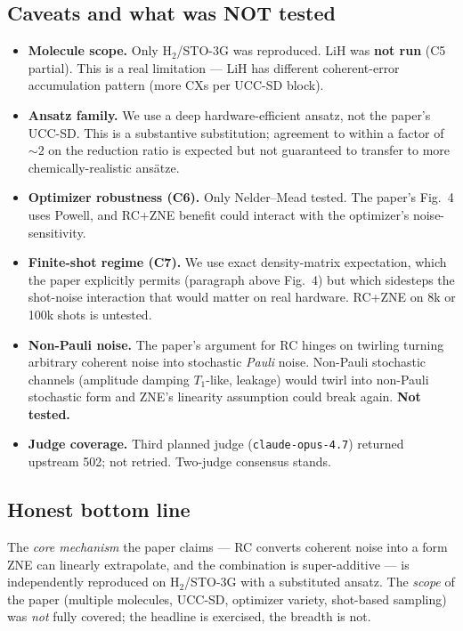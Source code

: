 \documentclass[11pt]{article}
\begin{document}
\subsection{Caveats and what was NOT tested}
\begin{itemize}
  \item \textbf{Molecule scope.} Only H$_2$/STO-3G was reproduced. LiH was
        \textbf{not run} (C5 partial). This is a real limitation --- LiH has
        different coherent-error accumulation pattern (more CXs per UCC-SD
        block).
  \item \textbf{Ansatz family.} We use a deep hardware-efficient ansatz, not
        the paper's UCC-SD. This is a substantive substitution; agreement to
        within a factor of $\sim 2$ on the reduction ratio is expected but not
        guaranteed to transfer to more chemically-realistic ans\"atze.
  \item \textbf{Optimizer robustness (C6).} Only Nelder--Mead tested. The
        paper's Fig.~4 uses Powell, and RC+ZNE benefit could interact with the
        optimizer's noise-sensitivity.
  \item \textbf{Finite-shot regime (C7).} We use exact density-matrix
        expectation, which the paper explicitly permits (paragraph above
        Fig.~4) but which sidesteps the shot-noise interaction that would
        matter on real hardware. RC+ZNE on 8k or 100k shots is untested.
  \item \textbf{Non-Pauli noise.} The paper's argument for RC hinges on
        twirling turning arbitrary coherent noise into stochastic \emph{Pauli}
        noise. Non-Pauli stochastic channels (amplitude damping $T_1$-like,
        leakage) would twirl into non-Pauli stochastic form and ZNE's linearity
        assumption could break again. \textbf{Not tested.}
  \item \textbf{Judge coverage.} Third planned judge (\texttt{claude-opus-4.7})
        returned upstream 502; not retried. Two-judge consensus stands.
\end{itemize}

\subsection{Honest bottom line}
The \emph{core mechanism} the paper claims --- RC converts coherent noise into a
form ZNE can linearly extrapolate, and the combination is super-additive --- is
independently reproduced on H$_2$/STO-3G with a substituted ansatz. The
\emph{scope} of the paper (multiple molecules, UCC-SD, optimizer variety,
shot-based sampling) was \emph{not} fully covered; the headline is exercised,
the breadth is not.
\end{document}
